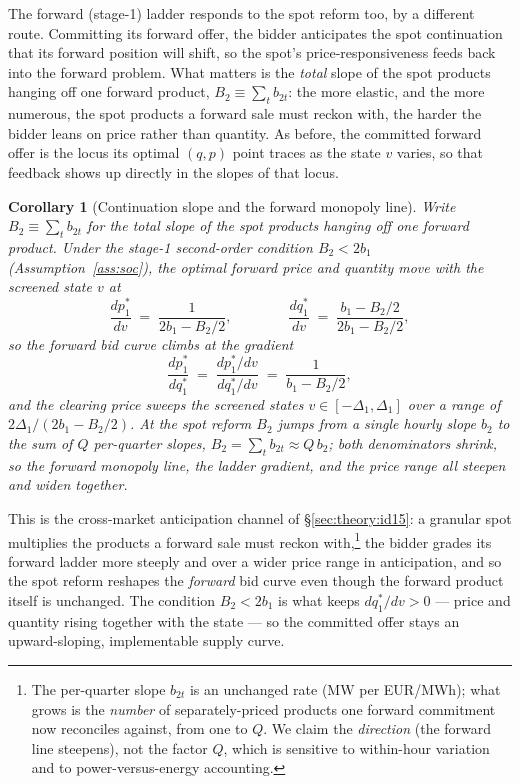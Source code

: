 \documentclass[11pt,a4paper]{article}
\newtheorem{corollary}{Corollary}
\theoremstyle{definition}
\theoremstyle{remark}
\theoremstyle{plain}
\begin{document}
The forward (stage-1) ladder responds to the spot reform too, by a different route. Committing its forward offer, the bidder anticipates the spot continuation that its forward position will shift, so the spot's price-responsiveness feeds back into the forward problem. What matters is the \emph{total} slope of the spot products hanging off one forward product, $B_2 \equiv \sum_t b_{2t}$: the more elastic, and the more numerous, the spot products a forward sale must reckon with, the harder the bidder leans on price rather than quantity. As before, the committed forward offer is the locus its optimal $(q,p)$ point traces as the state $v$ varies, so that feedback shows up directly in the slopes of that locus.

\begin{corollary}[Continuation slope and the forward monopoly line]\label{cor:continuation}
Write $B_2 \equiv \sum_t b_{2t}$ for the total slope of the spot products hanging off one forward product. Under the stage-1 second-order condition $B_2 < 2 b_1$ (Assumption~\ref{ass:soc}), the optimal forward price and quantity move with the screened state $v$ at
\[
\frac{dp_1^*}{dv} \;=\; \frac{1}{2 b_1 - B_2/2}, \qquad\qquad
\frac{dq_1^*}{dv} \;=\; \frac{b_1 - B_2/2}{2 b_1 - B_2/2},
\]
so the forward bid curve climbs at the gradient
\[
\frac{dp_1^*}{dq_1^*} \;=\; \frac{dp_1^*/dv}{dq_1^*/dv} \;=\; \frac{1}{b_1 - B_2/2},
\]
and the clearing price sweeps the screened states $v \in [-\Delta_1, \Delta_1]$ over a range of $2\Delta_1/(2 b_1 - B_2/2)$. At the spot reform $B_2$ jumps from a single hourly slope $b_2$ to the sum of $Q$ per-quarter slopes, $B_2 = \sum_t b_{2t} \approx Q\, b_2$; both denominators shrink, so the forward monopoly line, the ladder gradient, and the price range all steepen and widen together.
\end{corollary}

This is the cross-market anticipation channel of \S\ref{sec:theory:id15}: a granular spot multiplies the products a forward sale must reckon with,\footnote{The per-quarter slope $b_{2t}$ is an unchanged rate (MW per EUR/MWh); what grows is the \emph{number} of separately-priced products one forward commitment now reconciles against, from one to $Q$. We claim the \emph{direction} (the forward line steepens), not the factor $Q$, which is sensitive to within-hour variation and to power-versus-energy accounting.} the bidder grades its forward ladder more steeply and over a wider price range in anticipation, and so the spot reform reshapes the \emph{forward} bid curve even though the forward product itself is unchanged. The condition $B_2 < 2 b_1$ is what keeps $dq_1^*/dv > 0$ --- price and quantity rising together with the state --- so the committed offer stays an upward-sloping, implementable supply curve.
\end{document}
